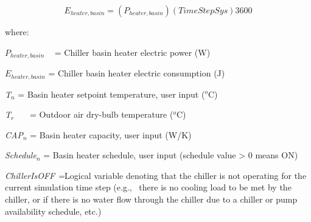 \begin{equation}
{E_{heater,basin}} = \left( {{P_{heater,basin}}} \right)\left( {TimeStepSys} \right)3600
\end{equation}

where:

\({P_{heater,basin}}\) ~ = Chiller basin heater electric power (W)

\({E_{heater,basin}}\) = Chiller basin heater electric consumption (J)

\emph{T\(_{n}\)} = Basin heater setpoint temperature, user input (\(^{o}\)C)

\emph{T\(_{r}\)}~~~ = Outdoor air dry-bulb temperature (\(^{o}\)C)

\emph{CAP\(_{n}\)} = Basin heater capacity, user input (W/K)

\emph{Schedule\(_{n}\)} = Basin heater schedule, user input (schedule value \textgreater{} 0 means ON)

\emph{ChillerIsOFF =}Logical variable denoting that the chiller is not operating for the current simulation time step (e.g.,~ there is no cooling load to be met by the chiller, or if there is no water flow through the chiller due to a chiller or pump availability schedule, etc.) 
